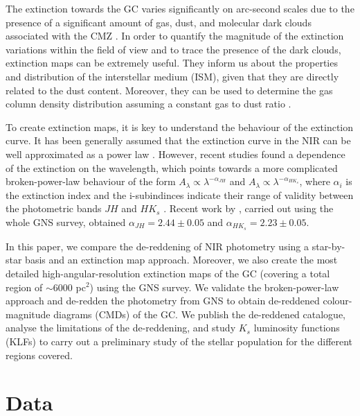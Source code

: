 \documentclass{aa}
\begin{document}
The extinction towards the GC varies significantly on arc-second scales \citep[][]{Scoville:2003la,Schodel:2010fk,Nogueras-Lara:2018aa} due to the presence of a significant amount of gas, dust, and molecular dark clouds associated with the CMZ \citep[e.g.][]{Dahmen:1998aa,Pierce-Price:2000aa}. In order to quantify the magnitude of the extinction variations within the field of view and to trace the presence of the dark clouds, extinction maps can be extremely useful. They inform us about the properties and distribution of the interstellar medium (ISM), given that they are directly related to the dust content. Moreover, they can be used to determine the gas column density distribution assuming a constant gas to dust ratio \citep[e.g.][]{Goodman:2009wp,Rowles:2009wt}. 


To create extinction maps, it is key to understand the behaviour of the extinction curve. It has been generally assumed that the extinction curve in the NIR can be well approximated as a power law \citep[e.g.][]{Rieke:1985fq,Nishiyama:2006tx,Fritz:2011fk}. However, recent studies found a dependence of the extinction on the wavelength, which points towards a more complicated broken-power-law behaviour of the form $A_{\lambda} \propto \lambda^{-\alpha_{JH}}$ and $A_{\lambda} \propto \lambda^{-\alpha_{HK_s}}$, where $\alpha_{i}$ is the extinction index and the i-subindinces indicate their range of validity between the photometric bands $JH$ and $HK_s$ \citep{Nogueras-Lara:2018aa,Hosek:2018aa,Nogueras-Lara:2019ac,Nogueras-Lara:2020aa}. Recent work by \citet{Nogueras-Lara:2020aa}, carried out using the whole GNS survey, obtained $\alpha_{JH} = 2.44\pm0.05$ and $\alpha_{HK_s} = 2.23\pm 0.05$.




In this paper, we compare the de-reddening of NIR photometry using a star-by-star basis and an extinction map approach. Moreover, we also create the most detailed high-angular-resolution extinction maps of the GC (covering a total region of $\sim 6000$ pc$^2$) using the GNS survey. We validate the broken-power-law approach and de-redden the photometry from GNS to obtain de-reddened colour-magnitude diagrams (CMDs) of the GC. We publish the de-reddened catalogue, analyse the limitations of the de-reddening, and study $K_s$ luminosity functions (KLFs) to carry out a preliminary study of the stellar population for the different regions covered.


  
 \section{Data}
 
\end{document}
